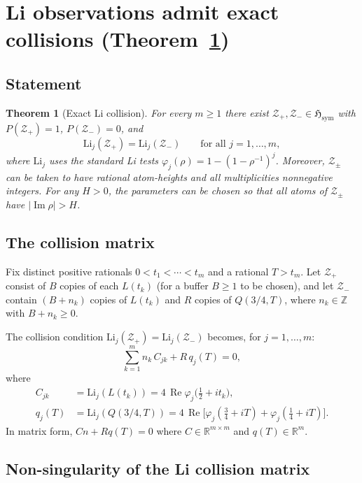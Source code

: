 \documentclass[12pt]{amsart}
\theoremstyle{definition}
\theoremstyle{remark}
\theoremstyle{plain}
\newtheorem{mainthm}{Theorem}
\newcommand{\Hsym}{\mathfrak{H}_{\mathrm{sym}}}
\newcommand{\Li}{\mathrm{Li}}
\newcommand{\re}{\operatorname{Re}}
\newcommand{\im}{\operatorname{Im}}
\newcommand{\RR}{\mathbb{R}}
\newcommand{\ZZ}{\mathbb{Z}}
\begin{document}
\section{Li observations admit exact collisions (Theorem~\ref{thm:A})}
\label{sec:B2}

\subsection{Statement}

\begin{mainthm}[Exact Li collision]
\label{thm:A}
For every $m \geq 1$ there exist $\mathcal{Z}_+, \mathcal{Z}_- \in \Hsym$
with $P(\mathcal{Z}_+) = 1$, $P(\mathcal{Z}_-) = 0$, and
\[
  \Li_j(\mathcal{Z}_+) = \Li_j(\mathcal{Z}_-) \qquad
  \text{for all } j = 1, \ldots, m,
\]
where $\Li_j$ uses the standard Li tests $\varphi_j(\rho)=1-(1-\rho^{-1})^j$.
Moreover, $\mathcal{Z}_\pm$ can be taken to have rational atom-heights and
all multiplicities nonnegative integers.  For any $H>0$, the parameters
can be chosen so that all atoms of $\mathcal{Z}_\pm$ have $|\im\rho|>H$.
\end{mainthm}

\subsection{The collision matrix}

Fix distinct positive rationals $0 < t_1 < \cdots < t_m$ and a rational
$T > t_m$.  Let $\mathcal{Z}_+$ consist of $B$ copies of each $L(t_k)$
(for a buffer $B \geq 1$ to be chosen), and let $\mathcal{Z}_-$ contain
$(B + n_k)$ copies of $L(t_k)$ and $R$ copies of $Q(3/4, T)$,
where $n_k \in \ZZ$ with $B + n_k \geq 0$.

The collision condition $\Li_j(\mathcal{Z}_+) = \Li_j(\mathcal{Z}_-)$
becomes, for $j = 1, \ldots, m$:
\[
  \sum_{k=1}^m n_k \, C_{jk} + R \, q_j(T) = 0,
  \tag{$\star$}\label{eq:collision}
\]
where
\begin{align*}
  C_{jk} &= \Li_j(L(t_k)) = 4\,\re\varphi_j\!\bigl({\textstyle\frac12}+it_k\bigr),\\
  q_j(T) &= \Li_j(Q(3/4,T))
           = 4\,\re\bigl[\varphi_j({\textstyle\frac34}+iT)
             + \varphi_j({\textstyle\frac14}+iT)\bigr].
\end{align*}
In matrix form, $Cn + Rq(T) = 0$ where $C \in \RR^{m \times m}$
and $q(T) \in \RR^m$.

\subsection{Non-singularity of the Li collision matrix}
\end{document}
